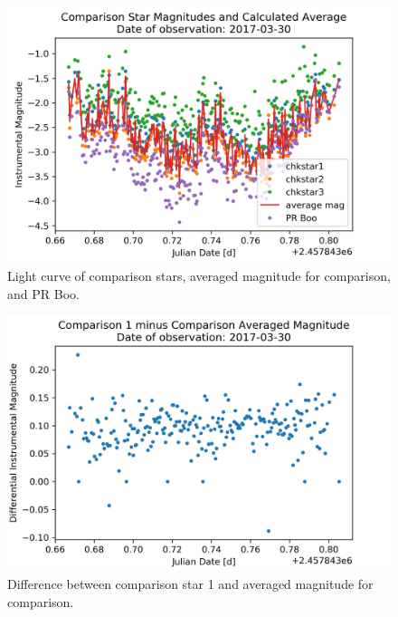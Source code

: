 \begin{figure}[h]
    \centering
    \includegraphics{figures/prboo170330COM.png}
    \caption{Light curve of comparison stars, averaged magnitude for comparison, and PR Boo.}
\label{fig:prCOM}
\end{figure}

\begin{figure}[h]
    \centering
    \includegraphics{figures/prboo170330CHK.png}
    \caption{Difference between comparison star 1 and averaged magnitude for comparison.}
\label{fig:prCHK}
\end{figure}

